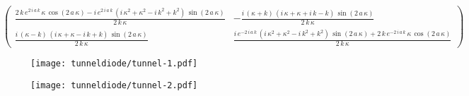 \[
\begin{pmatrix}
\frac{2\,k\,e^{2\,i\,a\,k}\,\kappa\,\cos \left(2\,a\,\kappa
 \right)-i\,e^{2\,i\,a\,k}\,\left(i\,\kappa^2+\kappa^2-i\,k^2+k^2
 \right)\,\sin \left(2\,a\,\kappa\right)}{2\,k\,\kappa}
&
-\frac{i\,
 \left(\kappa+k\right)\,\left(i\,\kappa+\kappa+i\,k-k\right)\,\sin 
 \left(2\,a\,\kappa\right)}{2\,k\,\kappa}
\\
\frac{i\,\left(\kappa-
 k\right)\,\left(i\,\kappa+\kappa-i\,k+k\right)\,\sin \left(2\,a\,
 \kappa\right)}{2\,k\,\kappa}
&
\frac{i\,e^ {- 2\,i\,a\,k }\,\left(i
 \,\kappa^2+\kappa^2-i\,k^2+k^2\right)\,\sin \left(2\,a\,\kappa
 \right)+2\,k\,e^ {- 2\,i\,a\,k }\,\kappa\,\cos \left(2\,a\,\kappa
 \right)}{2\,k\,\kappa}
\end{pmatrix}
\]

\begin{figure}
\centering
\texttt{[image: tunneldiode/tunnel-1.pdf]}
\end{figure}
\begin{figure}
\centering
\texttt{[image: tunneldiode/tunnel-2.pdf]}
\end{figure}
